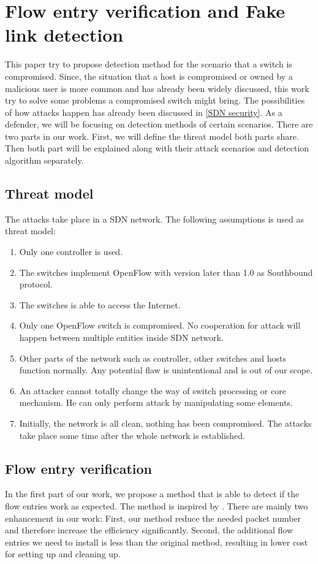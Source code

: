 \chapter{Flow entry verification and Fake link detection}
This paper try to propose detection method for the scenario that a switch is compromised. Since, the situation that a host is compromised or owned by a malicious user is more common and has already been widely discussed, this work try to solve some problems a compromised switch might bring. The possibilities of how attacks happen has already been discussed in \ref{SDN security}. As a defender, we will be focusing on detection methods of certain scenarios. There are two parts in our work. First, we will define the threat model both parts share. Then both part will be explained along with their attack scenarios and detection algorithm separately.

\section{Threat model}
The attacks take place in a SDN network. The following assumptions is used as threat model:
\begin{enumerate}
\item
Only one controller is used.
\item
The switches implement OpenFlow with version later than 1.0 as Southbound protocol.
\item
The switches is able to access the Internet. 
\item
Only one OpenFlow switch is compromised. No cooperation for attack will happen between multiple entities inside SDN network.
\item
Other parts of the network such as controller, other switches and hosts function normally. Any potential flaw is unintentional and is out of our scope.
\item
An attacker cannot totally change the way of switch processing or core mechanism. He can only perform attack by manipulating some elements.
\item
Initially, the network is all clean, nothing has been compromised. The attacks take place some time after the whole network is established. 
\end{enumerate}

\section{Flow entry verification}
In the first part of our work, we propose a method that is able to detect if the flow entries work as expected. The method is inspired by \cite{CKGL15}. There are mainly two enhancement in our work: First, our method reduce the needed packet number and therefore increase the efficiency significantly. Second, the additional flow entries we need to install is less than the original method, resulting in lower cost for setting up and cleaning up. 

